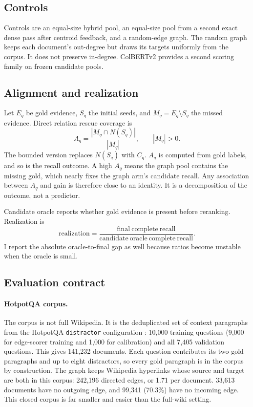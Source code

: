\documentclass[10pt,twocolumn]{article}
\begin{document}
\subsection{Controls}

Controls are an equal-size hybrid pool, an equal-size pool from a second exact
dense pass after centroid feedback, and a random-edge graph. The random graph
keeps each document's out-degree but draws its targets uniformly from the
corpus. It does not preserve in-degree. ColBERTv2
\citep{santhanam2022colbertv2} provides a second scoring family on frozen
candidate pools.

\subsection{Alignment and realization}

Let $E_q$ be gold evidence, $S_q$ the initial seeds, and
$M_q=E_q\setminus S_q$ the missed evidence. Direct relation rescue coverage is
\begin{equation}
  A_q=\frac{|M_q\cap N(S_q)|}{|M_q|}, \qquad |M_q|>0.
\end{equation}
The bounded version replaces $N(S_q)$ with $C_q$. $A_q$ is computed from gold
labels, and so is the recall outcome. A high $A_q$ means the graph pool
contains the missing gold, which nearly fixes the graph arm's candidate recall.
Any association between $A_q$ and gain is therefore close to an identity. It is
a decomposition of the outcome, not a predictor.

Candidate oracle reports whether gold evidence is present before reranking.
Realization is
\begin{equation}
  \mathrm{realization}=
  \frac{\mathrm{final\ complete\ recall}}
       {\mathrm{candidate\ oracle\ complete\ recall}}.
\end{equation}
I report the absolute oracle-to-final gap as well because ratios become
unstable when the oracle is small.

\subsection{Evaluation contract}

\paragraph{HotpotQA corpus.}
The corpus is not full Wikipedia. It is the deduplicated set of context
paragraphs from the HotpotQA \texttt{distractor} configuration
\citep{yang2018hotpotqa}: 10,000 training questions (9,000 for edge-scorer
training and 1,000 for calibration) and all 7,405 validation questions. This
gives 141,232 documents. Each question contributes its two gold paragraphs and
up to eight distractors, so every gold paragraph is in the corpus by
construction. The graph keeps Wikipedia hyperlinks whose source and target are
both in this corpus: 242,196 directed edges, or 1.71 per document. 33,613
documents have no outgoing edge, and 99,341 (70.3\%) have no incoming edge.
This closed corpus is far smaller and easier than the full-wiki setting.
\end{document}
